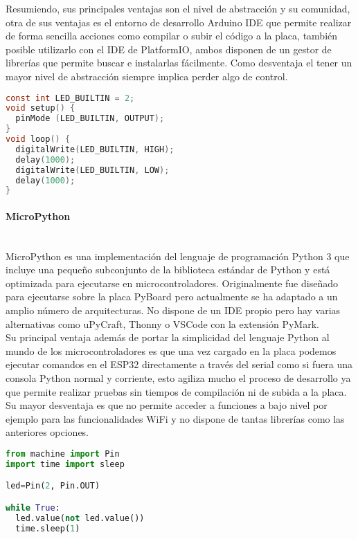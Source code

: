 \documentclass[../proyecto.tex]{subfiles}
\begin{document}
Resumiendo, sus principales ventajas son el nivel de abstracción y su comunidad, otra de sus ventajas es el entorno de desarrollo Arduino IDE que permite realizar de forma sencilla acciones como compilar o subir el código a la placa, también posible utilizarlo con el IDE de PlatformIO, ambos disponen de un gestor de librerías que permite buscar e instalarlas fácilmente. Como desventaja el tener un mayor nivel de abstracción siempre implica perder algo de control.\\

\begin{minipage}{\linewidth}
\begin{lstlisting}[language=C, caption=Ejemplo de código para hacer parpadear un led con Arduino, captionpos=b, frame=single]
const int LED_BUILTIN = 2;
void setup() {
  pinMode (LED_BUILTIN, OUTPUT);
}
void loop() {
  digitalWrite(LED_BUILTIN, HIGH);
  delay(1000);
  digitalWrite(LED_BUILTIN, LOW);
  delay(1000);
}
\end{lstlisting}
\end{minipage}

\paragraph{MicroPython}\mbox{}\\
MicroPython es una implementación del lenguaje de programación Python 3 que incluye una pequeño subconjunto de la biblioteca estándar de Python y está optimizada para ejecutarse en microcontroladores. Originalmente fue diseñado para ejecutarse sobre la placa PyBoard pero actualmente se ha adaptado a un amplio número de arquitecturas. No dispone de un IDE propio pero hay varias alternativas como uPyCraft, Thonny o  VSCode con la extensión PyMark.\\

Su principal ventaja además de portar la simplicidad del lenguaje Python al mundo de los microcontroladores es que una vez cargado en la placa podemos ejecutar comandos en el ESP32 directamente a través del serial como si fuera una consola Python normal y corriente, esto agiliza mucho el proceso de desarrollo ya que permite realizar pruebas sin tiempos de compilación ni de subida a la placa. Su mayor desventaja es que no permite acceder  a funciones a bajo nivel por ejemplo para las funcionalidades WiFi y no dispone de tantas librerías como las anteriores opciones.\\

\begin{minipage}{\linewidth}
\begin{lstlisting}[language=Python, caption=Ejemplo de código para hacer parpadear un led con MicroPython, captionpos=b, frame=single]
from machine import Pin
import time import sleep

led=Pin(2, Pin.OUT)

while True:
  led.value(not led.value())
  time.sleep(1)
\end{lstlisting}
\end{minipage}
\end{document}
